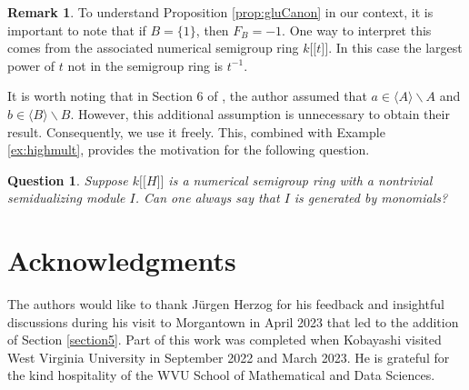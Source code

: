 \documentclass{amsart}
\newcommand{\ldb}{\mathopen{[\![}} %
\newcommand{\rdb}{\mathclose{]\!]}} %
\theoremstyle{plain}
\newtheorem{question}[theorem]{Question}
\theoremstyle{definition}
\newtheorem{remark}[theorem]{Remark}
\numberwithin{theorem}{section}
\numberwithin{equation}{section}
\numberwithin{equation}{theorem}
\begin{document}
\begin{remark}
To understand Proposition \ref{prop:gluCanon} in our context, it is important to note that if $B = \{1\}$, then $F_B = -1$. One way to interpret this comes from the associated numerical semigroup ring $k \ldb t \rdb$. In this case the largest power of $t$ not in the semigroup ring is $t^{-1}$.
\end{remark}

It is worth noting that in Section 6 of \cite{N13}, the author assumed that $a \in \langle A \rangle \backslash A$ and $b \in \langle B \rangle \backslash B$. However, this additional assumption is unnecessary to obtain their result. Consequently, we use it freely. This, combined with Example \ref{ex:highmult}, provides the motivation for the following question.

\begin{question}\label{question:monomial}
Suppose $k \ldb H \rdb$ is a numerical semigroup ring with a nontrivial semidualizing module $I$. Can one always say that $I$ is generated by monomials?
\end{question}

\section*{Acknowledgments}

The authors would like to thank J\"urgen Herzog for his feedback and insightful discussions during his visit to Morgantown in April 2023 that led to the addition of Section \ref{section5}. Part of this work was completed when Kobayashi visited West Virginia University in September 2022 and March 2023. He is grateful for the kind hospitality of the WVU School of Mathematical and Data Sciences.
\end{document}
